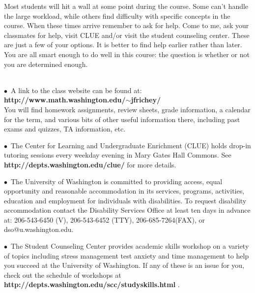 \documentclass[11 pt]{report}
\begin{document}
\vspace{.25cm}  

 Most students will hit a wall at some point
during the course.  Some can't handle the large workload, while
others find difficulty with specific concepts in the course. When
these times arrive remember to ask for help.  Come to me, ask your classmates for help, visit CLUE and/or visit the student counseling center.  These are just a
few of your options. It is better to find help earlier rather
than later. You are all smart enough to do well in this course: the
question is whether or not you are determined enough.
\vspace{0.3cm}

 \\
\noindent $\bullet$\ A link to the class website can be
found at: {\bf http://www.math.washington.edu/$\sim$jfrichey/} \\ You
will find homework assignments, review sheets, grade information, a
calendar for the term, and various bits of other useful information
there, including past exams and quizzes, TA information, etc.


\vspace{.2cm}

\noindent $\bullet$\ The Center for Learning and Undergraduate
Enrichment (CLUE) holds drop-in tutoring sessions every weekday
evening in Mary Gates Hall Commons.  See {\bf http://depts.washington.edu/clue/} for more details.

\vspace{.2cm}

\noindent $\bullet$\ The University of Washington is committed to providing
access, equal opportunity and reasonable accommodation in its
services, programs, activities, education and employment for
individuals with disabilities.  To request disability accommodation
contact the Disability Services Office at least ten days in advance
at: 206-543-6450 (V), 206-543-6452 (TTY), 206-685-7264(FAX), or
dso@u.washington.edu.

\vspace{.2cm}

\noindent $\bullet$\  The Student Counseling Center provides academic skills
workshop on a variety of topics including stress management test
anxiety and time management to help you succeed at the University of
Washington. If any of these is an issue for you, check out the
schedule of workshops at {\bf
http://depts.washington.edu/scc/studyskills.html} .
\end{document}
